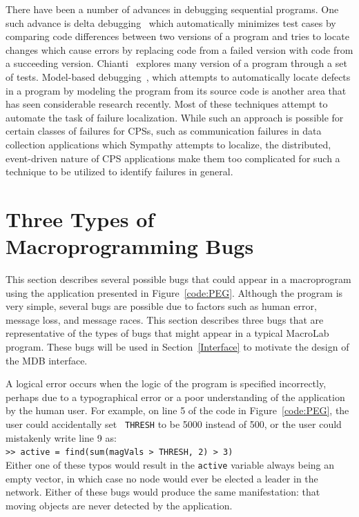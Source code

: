There have been a number of advances in debugging sequential programs. One such
advance is delta debugging~\cite{Zeller1999} which automatically minimizes test
cases by comparing code differences between two versions of a program and tries
to locate changes which cause errors by replacing code from a failed version
with code from a succeeding version. Chianti~\cite{Ren2004} explores many
version of a program through a set of tests. Model-based
debugging~\cite{Mayer2008}, which attempts to automatically locate defects in a
program by modeling the program from its source code is another area that has
seen considerable research recently. Most of these techniques attempt to
automate the task of failure localization. While such an approach is possible
for certain classes of failures for CPSs, such as communication failures in data
collection applications which Sympathy attempts to localize, the distributed,
event-driven nature of CPS applications make them too complicated for such a
technique to be utilized to identify failures in general.

\section{Three Types of Macroprogramming Bugs} \label{Bugs} 

This section describes several possible bugs that could appear in a macroprogram
using the application presented in Figure~\ref{code:PEG}. Although the program
is very simple, several bugs are possible due to factors such as human error,
message loss, and message races. This section describes three bugs that are
representative of the types of bugs that might appear in a typical MacroLab
program.  These bugs will be used in Section~\ref{Interface} to motivate the
design of the MDB interface.

A logical error occurs when the logic of
the program is specified incorrectly, perhaps due to a typographical error or a
poor understanding of the application by the human user.  For example, on line 5
of the code in Figure~\ref{code:PEG}, the user could accidentally set {\tt
THRESH} to be 5000 instead of 500, or the user could mistakenly write line 9
as:\\ {\small\indent\tt >> active = find(sum(magVals > THRESH, 2) > 3)}\\ Either
one of these typos would result in the {\tt active} variable always being an
empty vector, in which case no node would ever be elected a leader in the
network.  Either of these bugs would produce the same manifestation: that moving
objects are never detected by the application.

